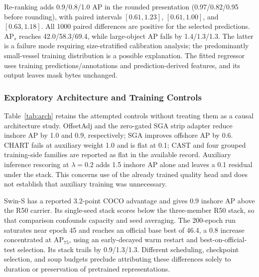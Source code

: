 Re-ranking adds 0.9/0.8/1.0 AP in the rounded presentation (0.97/0.82/0.95 before rounding), with paired intervals $[0.61,1.23]$, $[0.61,1.00]$, and $[0.63,1.18]$. All 1000 paired differences are positive for the selected predictions. AP$_s$ reaches 42.0/58.3/69.4, while large-object AP falls by 1.4/1.3/1.3. The latter is a failure mode requiring size-stratified calibration analysis; the predominantly small-vessel training distribution is a possible explanation. The fitted regressor uses training predictions/annotations and prediction-derived features, and its output leaves mask bytes unchanged.

\subsubsection{Exploratory Architecture and Training Controls}\label{sec:exp:arch}
Table~\ref{tab:arch} retains the attempted controls without treating them as a causal architecture study. OffsetAdj and the zero-gated SGA strip adapter \cite{striprcnn2026,cait2021} reduce inshore AP by 1.0 and 0.9, respectively; SGA improves offshore AP by 0.6. CHART fails at auxiliary weight 1.0 and is flat at 0.1; CAST and four grouped training-side families are reported as flat in the available record. Auxiliary inference rescoring at $\lambda=0.2$ adds 1.5 inshore AP alone and leaves a 0.1 residual under the stack. This concerns use of the already trained quality head and does not establish that auxiliary training was unnecessary.

Swin-S \cite{swin2021} has a reported 3.2-point COCO advantage and gives 0.9 inshore AP above the R50 carrier. Its single-seed stack scores below the three-member R50 stack, so that comparison confounds capacity and seed averaging. The 200-epoch run saturates near epoch 45 and reaches an official base best of 46.4, a 0.8 increase concentrated at AP$_{75}$, using an early-decayed warm restart and best-on-official-test selection. Its stack trails by 0.9/1.3/1.3. Different scheduling, checkpoint selection, and soup budgets preclude attributing these differences solely to duration or preservation of pretrained representations.


